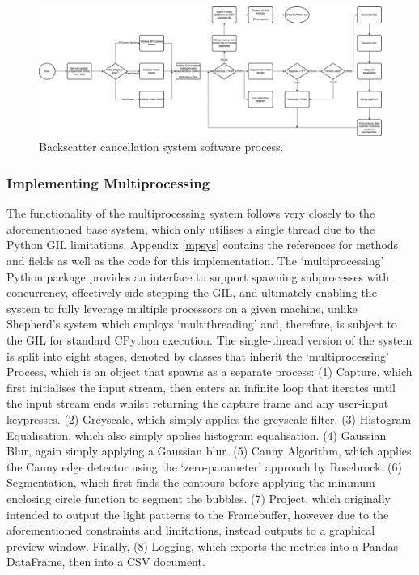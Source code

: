 \pagebreak
\begin{landscape}
    \begin{figure}
        \centering
        \includegraphics[width=1\linewidth]{assets/impl_system-flow.png}
        \caption{Backscatter cancellation system software process.}
        \label{fig:sysflow}
    \end{figure}
\end{landscape}
\pagebreak

\subsubsection{Implementing Multiprocessing}

The functionality of the multiprocessing system follows very closely to the aforementioned base system, which only utilises a single thread due to the Python GIL limitations. Appendix \ref{mpsys} contains the references for methods and fields as well as the code for this implementation. The `multiprocessing' Python package provides an interface to support spawning subprocesses with concurrency, effectively side-stepping the GIL, and ultimately enabling the system to fully leverage multiple processors on a given machine, unlike Shepherd's system which employs `multithreading' and, therefore, is subject to the GIL for standard CPython execution. The single-thread version of the system is split into eight stages, denoted by classes that inherit the `multiprocessing' Process, which is an object that spawns as a separate process: (1) Capture, which first initialises the input stream, then enters an infinite loop that iterates until the input stream ends whilst returning the capture frame and any user-input keypresses. (2) Greyscale, which simply applies the greyscale filter. (3) Histogram Equalisation, which also simply applies histogram equalisation. (4) Gaussian Blur, again simply applying a Gaussian blur. (5) Canny Algorithm, which applies the Canny edge detector using the `zero-parameter' approach by Rosebrock. (6) Segmentation, which first finds the contours before applying the minimum enclosing circle function to segment the bubbles. (7) Project, which originally intended to output the light patterns to the Framebuffer, however due to the aforementioned constraints and limitations, instead outputs to a graphical preview window. Finally, (8) Logging, which exports the metrics into a Pandas DataFrame, then into a CSV document.

